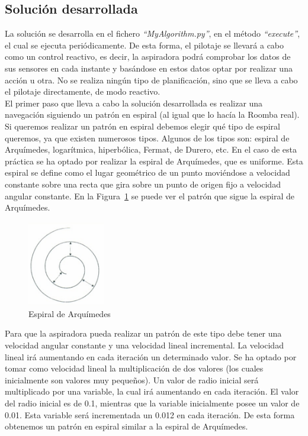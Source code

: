 \subsection{Solución desarrollada}
La solución se desarrolla en el fichero \textit{``MyAlgorithm.py''}, en el método \textit{``execute''}, el cual se ejecuta periódicamente. De esta forma, el pilotaje se llevará a cabo como un control reactivo, es decir, la aspiradora podrá comprobar los datos de sus sensores en cada instante y basándose en estos datos optar por realizar una acción u otra. No se realiza ningún tipo de planificación, sino que se lleva a cabo el pilotaje directamente, de modo reactivo.\\

El primer paso que lleva a cabo la solución desarrollada es realizar una navegación siguiendo un patrón en espiral (al igual que lo hacía la Roomba real). Si queremos realizar un patrón en espiral debemos elegir qué tipo de espiral queremos, ya que existen numerosos tipos. Algunos de los tipos son: espiral de Arquímedes, logarítmica, hiperbólica, Fermat, de Durero, etc. En el caso de esta práctica se ha optado por realizar la espiral de Arquímedes, que es uniforme. Esta espiral se define como el lugar geométrico de un punto moviéndose a velocidad constante sobre una recta que gira sobre un punto de origen fijo a velocidad angular constante. En la Figura~\ref{fig.Espiral_Arquimedes} se puede ver el patrón que sigue la espiral de Arquímedes.\\

\begin{figure}[H]
  \begin{center}
    \includegraphics[width=0.3\textwidth]{figures/Vacuum/Espiral_Arquimedes.png}
		\caption{Espiral de Arquímedes}
		\label{fig.Espiral_Arquimedes}
		\end{center}
\end{figure}

Para que la aspiradora pueda realizar un patrón de este tipo debe tener una velocidad angular constante y una velocidad lineal incremental. La velocidad lineal irá aumentando en cada iteración un determinado valor. Se ha optado por tomar como velocidad lineal la multiplicación de dos valores (los cuales inicialmente son valores muy pequeños). Un valor de radio inicial será multiplicado por una variable, la cual irá aumentando en cada iteración. El valor del radio inicial es de 0.1, mientras que la variable inicialmente posee un valor de 0.01. Esta variable será incrementada un 0.012 en cada iteración. De esta forma obtenemos un patrón en espiral similar a la espiral de Arquímedes.\\

